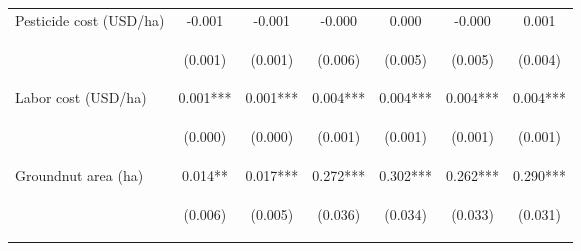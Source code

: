 \begin{center}
\begin{tabular}{lcccccc}
Pesticide cost (USD/ha) & -0.001 & -0.001 & -0.000 & 0.000 & -0.000 & 0.001 \\
\vspace{4pt} & \begin{footnotesize}(0.001)\end{footnotesize} & \begin{footnotesize}(0.001)\end{footnotesize} & \begin{footnotesize}(0.006)\end{footnotesize} & \begin{footnotesize}(0.005)\end{footnotesize} & \begin{footnotesize}(0.005)\end{footnotesize} & \begin{footnotesize}(0.004)\end{footnotesize} \\
Labor cost (USD/ha) & 0.001*** & 0.001*** & 0.004*** & 0.004*** & 0.004*** & 0.004*** \\
\vspace{4pt} & \begin{footnotesize}(0.000)\end{footnotesize} & \begin{footnotesize}(0.000)\end{footnotesize} & \begin{footnotesize}(0.001)\end{footnotesize} & \begin{footnotesize}(0.001)\end{footnotesize} & \begin{footnotesize}(0.001)\end{footnotesize} & \begin{footnotesize}(0.001)\end{footnotesize} \\
Groundnut area (ha) & 0.014** & 0.017*** & 0.272*** & 0.302*** & 0.262*** & 0.290*** \\
\vspace{4pt} & \begin{footnotesize}(0.006)\end{footnotesize} & \begin{footnotesize}(0.005)\end{footnotesize} & \begin{footnotesize}(0.036)\end{footnotesize} & \begin{footnotesize}(0.034)\end{footnotesize} & \begin{footnotesize}(0.033)\end{footnotesize} & \begin{footnotesize}(0.031)\end{footnotesize} \\

\end{tabular}
\end{center}
